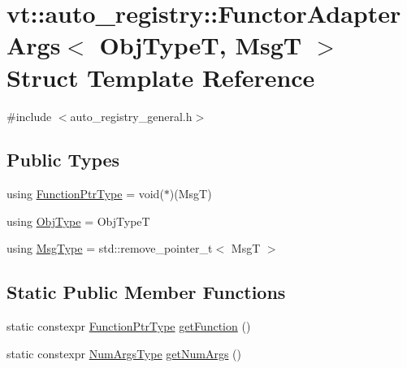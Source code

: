 \hypertarget{structvt_1_1auto__registry_1_1_functor_adapter_args_3_01_obj_type_t_00_01_msg_t_01_4}{}\section{vt\+:\+:auto\+\_\+registry\+:\+:Functor\+Adapter\+Args$<$ Obj\+TypeT, MsgT $>$ Struct Template Reference}
\label{structvt_1_1auto__registry_1_1_functor_adapter_args_3_01_obj_type_t_00_01_msg_t_01_4}


{\ttfamily \#include $<$auto\+\_\+registry\+\_\+general.\+h$>$}

\subsection*{Public Types}
\begin{DoxyCompactItemize}
\item 
using \hyperlink{structvt_1_1auto__registry_1_1_functor_adapter_args_3_01_obj_type_t_00_01_msg_t_01_4_a2ce9fa0acf9d716c816a46240859e1eb}{Function\+Ptr\+Type} = void($\ast$)(MsgT)
\item 
using \hyperlink{structvt_1_1auto__registry_1_1_functor_adapter_args_3_01_obj_type_t_00_01_msg_t_01_4_a1ba1a1e7fc7320bf4eb1f072212451e9}{Obj\+Type} = Obj\+TypeT
\item 
using \hyperlink{structvt_1_1auto__registry_1_1_functor_adapter_args_3_01_obj_type_t_00_01_msg_t_01_4_acc29822fb90b386dd16a229450f9ec97}{Msg\+Type} = std\+::remove\+\_\+pointer\+\_\+t$<$ MsgT $>$
\end{DoxyCompactItemize}
\subsection*{Static Public Member Functions}
\begin{DoxyCompactItemize}
\item 
static constexpr \hyperlink{structvt_1_1auto__registry_1_1_functor_adapter_args_3_01_obj_type_t_00_01_msg_t_01_4_a2ce9fa0acf9d716c816a46240859e1eb}{Function\+Ptr\+Type} \hyperlink{structvt_1_1auto__registry_1_1_functor_adapter_args_3_01_obj_type_t_00_01_msg_t_01_4_a55d38cec4b0454ea42be9308bfe77238}{get\+Function} ()
\item 
static constexpr \hyperlink{namespacevt_1_1auto__registry_aebda1d9d765bc9147dc654ad0712c936}{Num\+Args\+Type} \hyperlink{structvt_1_1auto__registry_1_1_functor_adapter_args_3_01_obj_type_t_00_01_msg_t_01_4_a3c47d14a1de80bbc198e55deac7e4176}{get\+Num\+Args} ()
\end{DoxyCompactItemize}


